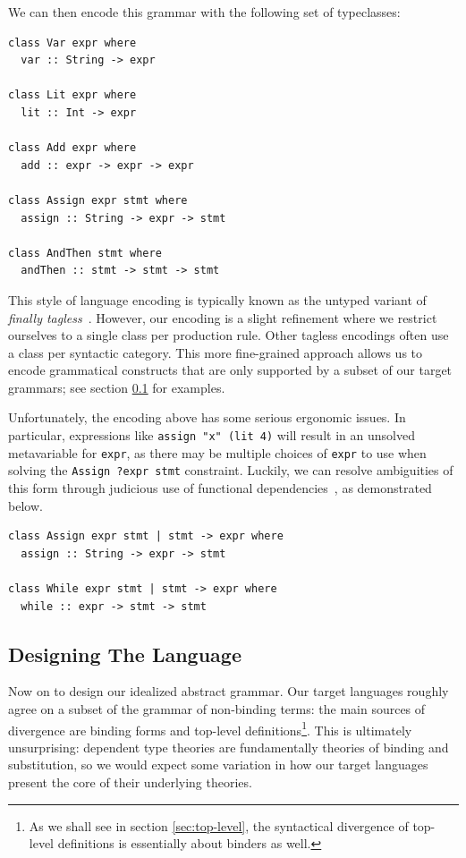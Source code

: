 \documentclass[a4paper,UKenglish,cleveref, autoref, thm-restate,anonymous]{lipics-v2021}
\begin{document}
We can then encode this grammar with the following set of typeclasses:

\begin{lstlisting}[style=haskell,caption={An example tagless encoding.}]
class Var expr where
  var :: String -> expr

class Lit expr where
  lit :: Int -> expr

class Add expr where
  add :: expr -> expr -> expr

class Assign expr stmt where
  assign :: String -> expr -> stmt

class AndThen stmt where
  andThen :: stmt -> stmt -> stmt
\end{lstlisting}

This style of language encoding is typically known as the untyped variant of \emph{finally tagless}~\cite{Carette-Kiselyov-Shan:2009}.
However, our encoding is a slight refinement where
we restrict ourselves to a single class per production rule. Other
tagless encodings often use a class per syntactic category. This more fine-grained approach
allows us to encode grammatical constructs that are only supported by a subset of our target
grammars; see section \ref{sec:language-design} for examples.

Unfortunately, the encoding above has some serious ergonomic issues. In particular, expressions
like \lstinline|assign "x" (lit 4)| will result in an unsolved metavariable for \lstinline|expr|,
as there may be multiple choices of \lstinline|expr| to use when solving the \lstinline|Assign ?expr stmt|
constraint. Luckily, we can resolve ambiguities of this form through judicious use of functional dependencies~\cite{Jones:2000},
as demonstrated below.

\begin{lstlisting}[style=haskell, caption={A tagless encoding with functional dependencies.}]
class Assign expr stmt | stmt -> expr where
  assign :: String -> expr -> stmt

class While expr stmt | stmt -> expr where
  while :: expr -> stmt -> stmt
\end{lstlisting}

\subsection{Designing The Language}
\label{sec:language-design}

Now on to design our idealized abstract grammar. Our target languages
roughly agree on a subset of
the grammar of non-binding terms: the main sources of divergence are binding
forms and top-level definitions\footnote{As we shall see in section
\ref{sec:top-level}, the syntactical divergence of top-level definitions is
essentially about binders as well.}.
This is ultimately unsurprising: dependent type theories are fundamentally theories of binding and
substitution, so we would expect some variation in how our target languages present the core of
their underlying theories.
\end{document}
